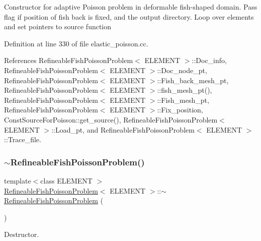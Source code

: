 Constructor for adaptive Poisson problem in deformable fish-\/shaped domain. Pass flag if position of fish back is fixed, and the output directory. Loop over elements and set pointers to source function 

Definition at line 330 of file elastic\+\_\+poisson.\+cc.



References Refineable\+Fish\+Poisson\+Problem$<$ E\+L\+E\+M\+E\+N\+T $>$\+::\+Doc\+\_\+info, Refineable\+Fish\+Poisson\+Problem$<$ E\+L\+E\+M\+E\+N\+T $>$\+::\+Doc\+\_\+node\+\_\+pt, Refineable\+Fish\+Poisson\+Problem$<$ E\+L\+E\+M\+E\+N\+T $>$\+::\+Fish\+\_\+back\+\_\+mesh\+\_\+pt, Refineable\+Fish\+Poisson\+Problem$<$ E\+L\+E\+M\+E\+N\+T $>$\+::fish\+\_\+mesh\+\_\+pt(), Refineable\+Fish\+Poisson\+Problem$<$ E\+L\+E\+M\+E\+N\+T $>$\+::\+Fish\+\_\+mesh\+\_\+pt, Refineable\+Fish\+Poisson\+Problem$<$ E\+L\+E\+M\+E\+N\+T $>$\+::\+Fix\+\_\+position, Const\+Source\+For\+Poisson\+::get\+\_\+source(), Refineable\+Fish\+Poisson\+Problem$<$ E\+L\+E\+M\+E\+N\+T $>$\+::\+Load\+\_\+pt, and Refineable\+Fish\+Poisson\+Problem$<$ E\+L\+E\+M\+E\+N\+T $>$\+::\+Trace\+\_\+file.

\mbox{\label{classRefineableFishPoissonProblem_a7039a3409520850908940927b91af9ab}} 
\subsubsection{\texorpdfstring{$\sim$\+Refineable\+Fish\+Poisson\+Problem()}{~RefineableFishPoissonProblem()}}
{\footnotesize\ttfamily template$<$class E\+L\+E\+M\+E\+NT $>$ \\
\hyperlink{classRefineableFishPoissonProblem}{Refineable\+Fish\+Poisson\+Problem}$<$ E\+L\+E\+M\+E\+NT $>$\+::$\sim$\hyperlink{classRefineableFishPoissonProblem}{Refineable\+Fish\+Poisson\+Problem} (\begin{DoxyParamCaption}{ }\end{DoxyParamCaption})\hspace{0.3cm}{\ttfamily [virtual]}}



Destructor. 

